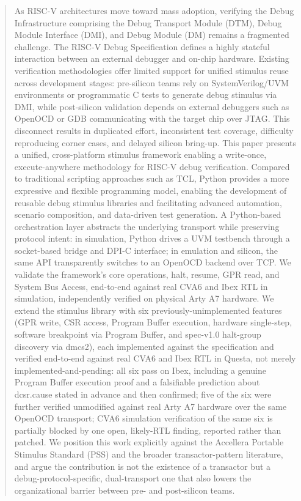 \documentclass[conference]{IEEEtran}
\begin{document}
\begin{abstract}
As RISC-V architectures move toward mass adoption, verifying the Debug Infrastructure comprising the Debug Transport Module (DTM), Debug Module Interface (DMI), and Debug Module (DM) remains a fragmented challenge. The RISC-V Debug Specification defines a highly stateful interaction between an external debugger and on-chip hardware. Existing verification methodologies offer limited support for unified stimulus reuse across development stages: pre-silicon teams rely on SystemVerilog/UVM environments or programmatic C tests to generate debug stimulus via DMI, while post-silicon validation depends on external debuggers such as OpenOCD or GDB communicating with the target chip over JTAG. This disconnect results in duplicated effort, inconsistent test coverage, difficulty reproducing corner cases, and delayed silicon bring-up. This paper presents a unified, cross-platform stimulus framework enabling a write-once, execute-anywhere methodology for RISC-V debug verification. Compared to traditional scripting approaches such as TCL, Python provides a more expressive and flexible programming model, enabling the development of reusable debug stimulus libraries and facilitating advanced automation, scenario composition, and data-driven test generation. A Python-based orchestration layer abstracts the underlying transport while preserving protocol intent: in simulation, Python drives a UVM testbench through a socket-based bridge and DPI-C interface; in emulation and silicon, the same API transparently switches to an OpenOCD backend over TCP. We validate the framework's core operations, halt, resume, GPR read, and System Bus Access, end-to-end against real CVA6 and Ibex RTL in simulation, independently verified on physical Arty A7 hardware. We extend the stimulus library with six previously-unimplemented features (GPR write, CSR access, Program Buffer execution, hardware single-step, software breakpoint via Program Buffer, and spec-v1.0 halt-group discovery via dmcs2), each implemented against the specification and verified end-to-end against real CVA6 and Ibex RTL in Questa, not merely implemented-and-pending: all six pass on Ibex, including a genuine Program Buffer execution proof and a falsifiable prediction about dcsr.cause stated in advance and then confirmed; five of the six were further verified unmodified against real Arty A7 hardware over the same OpenOCD transport; CVA6 simulation verification of the same six is partially blocked by one open, likely-RTL finding, reported rather than patched. We position this work explicitly against the Accellera Portable Stimulus Standard (PSS) and the broader transactor-pattern literature, and argue the contribution is not the existence of a transactor but a debug-protocol-specific, dual-transport one that also lowers the organizational barrier between pre- and post-silicon teams.
\end{abstract}
\end{document}

